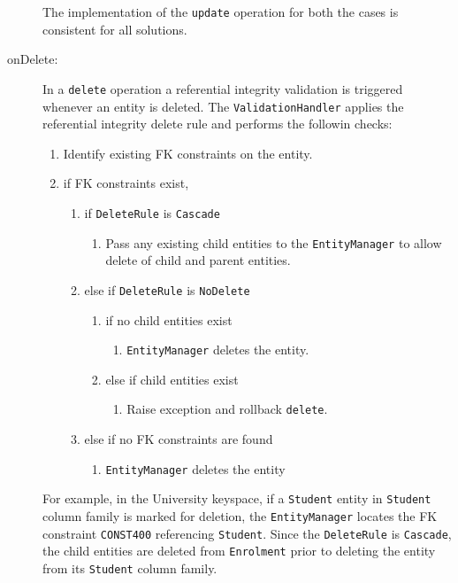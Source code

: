 \begin{description}
\begin{description}
		\end{description}
		The implementation of the \texttt{update} operation for both the cases is
		consistent for all solutions.
		
		\item[onDelete:] In a \texttt{delete} operation a referential
		integrity validation is triggered whenever an entity is deleted. The
		\texttt{ValidationHandler} applies the referential integrity delete rule
		and performs the followin checks:
		\renewcommand{\labelenumii}{\arabic{enumi}.\arabic{enumii}}
		\renewcommand{\labelenumiii}{\arabic{enumi}.\arabic{enumii}.\arabic{enumiii}}
		
		\begin{enumerate}
		  \item Identify existing \ac{FK} constraints on the entity.
		  \item if \ac{FK} constraints exist,
		  		\begin{enumerate}
		  		  \item if \texttt{DeleteRule} is \texttt{Cascade}
		  		 		\begin{enumerate}
		  		 		  \item Pass any existing child entities to the \texttt{EntityManager} to
		    	  				allow delete of child  and parent entities.
		  		 		\end{enumerate}
		  		  \item else if \texttt{DeleteRule}  is \texttt{NoDelete}
						\begin{enumerate}
						  \item if no child entities exist
						  		\begin{enumerate}
						  		  \item \texttt{EntityManager} deletes the entity.
						  		\end{enumerate}
						  \item else if child entities exist
						   		\begin{enumerate}
						    		\item Raise exception and rollback \texttt{delete}. 
						    	\end{enumerate}
						\end{enumerate}
						
				  \item else if no \ac{FK} constraints are found 
				  		\begin{enumerate}
				  		  \item \texttt{EntityManager} deletes the entity
						\end{enumerate}
		  		\end{enumerate}
		\end{enumerate}	
		For example,  in the University keyspace,  if a 
		\texttt{Student} entity in \texttt{Student} column family is marked for
		deletion, the \texttt{EntityManager} locates the \ac{FK} constraint 
		\texttt{CONST400} referencing \texttt{Student}.
		Since the \texttt{DeleteRule} is \texttt{Cascade}, 
		the child entities are deleted from \texttt{Enrolment} prior to deleting the
		entity from its \texttt{Student} column family. 
		\end{description}
		

